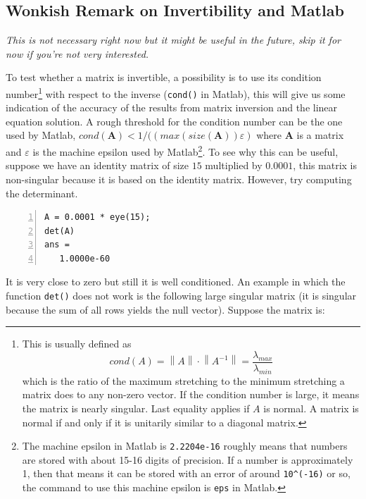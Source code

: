 \documentclass[a4paper,11pt]{article}
\begin{document}
\subsection{Wonkish Remark on Invertibility and Matlab}

\textit{This is not necessary right now but it might be useful in the future, skip it for now if you're not very interested.}

To test whether a matrix is invertible, a possibility is to use its condition number\footnote{This is usually defined as \[cond(A) = \left\lVert A \right\rVert \cdot \left\lVert A^{-1} \right\rVert = \frac{\lambda_{max}}{\lambda_{min}}\] which is the ratio of the maximum stretching to the minimum stretching a matrix does to any non-zero vector. If the condition number is large, it means the matrix is nearly singular. Last equality applies if $A$ is normal. A matrix is normal if and only if it is unitarily similar to a diagonal matrix.} with respect to the inverse (\verb;cond(); in Matlab), this will give us some indication of the accuracy of the results from matrix inversion and the linear equation solution. A rough threshold for the condition number can be the one used by Matlab, $cond(\mathbf{A}) < 1/((max(size(\mathbf{A}))\varepsilon)$ where $\mathbf{A}$ is a matrix and $\varepsilon$ is the machine epsilon used by Matlab\footnote{The machine epsilon in Matlab is \verb;2.2204e-16; roughly means that numbers are stored with about 15-16 digits of precision. If a number is approximately 1, then that means it can be stored with an error of around \verb;10^(-16); or so, the command to use this machine epsilon is \verb;eps; in Matlab.}. To see why this can be useful, suppose we have an identity matrix of size $15$ multiplied by $0.0001$, this matrix is non-singular because it is based on the identity matrix. However, try computing the determinant.

\begin{Verbatim}[numbers=left]
A = 0.0001 * eye(15);
det(A)
ans =
   1.0000e-60
\end{Verbatim}

It is very close to zero but still it is well conditioned. An example in which the function \verb+det()+ does not work is the following large singular matrix (it is singular because the sum of all rows yields the null vector). Suppose the matrix is:
\end{document}
